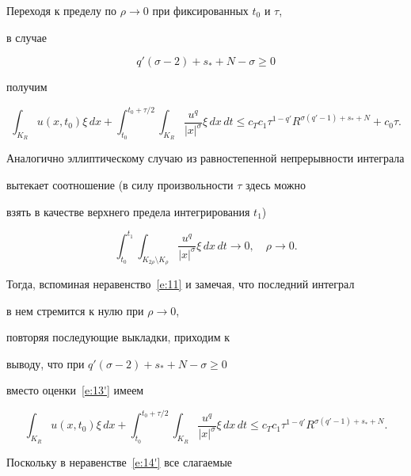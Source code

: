 Переходя к пределу по $\rho\to0$ при фиксированных $t_0$ и $\tau$,


в случае


$$


q'(\sigma-2)+s_*+N-\sigma\ge0


$$


получим


\begin{equation}\label{e:13'}


\int_{K_R} u(x,t_0)\xi\,dx+


\int_{t_0}^{t_0+\tau/2}\int_{K_R}


\frac{u^q}{|x|^\sigma}\xi\,dx\,dt\le


c_Tc_1\tau^{1-q'}R^{\sigma(q'-1)+s_*+N}+c_0\tau.


\end{equation}


Аналогично эллиптическому случаю из равностепенной непрерывности интеграла


вытекает соотношение (в силу произвольности $\tau$ здесь можно


взять в качестве верхнего предела интегрирования $t_1$)


$$


\int_{t_0}^{t_1}\int_{K_{2\rho}\setminus K_\rho}


\frac{u^q}{|x|^\sigma}\xi\,dx\,dt\to0,\quad


\rho\to0.


$$


Тогда, вспоминая неравенство~\eqref{e:11} и замечая, что последний интеграл


в нем стремится к нулю при $\rho\to0$, 


повторяя последующие выкладки, приходим к


выводу, что при $q'(\sigma-2)+s_*+N-\sigma\ge0$ 


вместо оценки~\eqref{e:13'} имеем


\begin{equation}\label{e:14'}


\int_{K_R} u(x,t_0)\xi\,dx+


\int_{t_0}^{t_0+\tau/2}\int_{K_R}


\frac{u^q}{|x|^\sigma}\xi\,dx\,dt\le


c_Tc_1\tau^{1-q'}R^{\sigma(q'-1)+s_*+N}.


\end{equation}





Поскольку в неравенстве~\eqref{e:14'} все слагаемые


